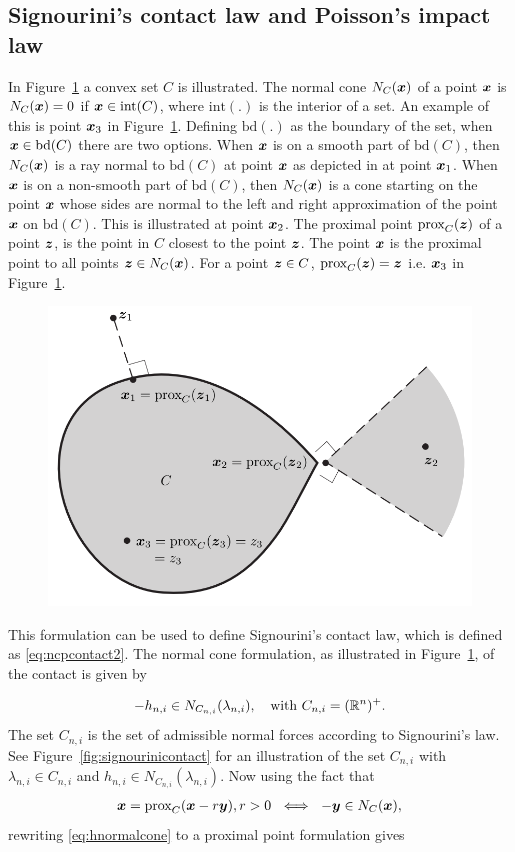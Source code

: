 \documentclass[DC2017114Bouma.tex]{subfiles}
\begin{document}
\subsection{Signourini's contact law and Poisson's impact law}
In Figure~\ref{fig:convex} a convex set $C$ is illustrated. The normal cone $N_C({\boldsymbol{x}})$ of a point ${\boldsymbol{x}}$ is $N_C({\boldsymbol{x}})=0$ if ${\boldsymbol{x}}\in \text{int}(C)$, where $\text{int}(.)$ is the interior of a set. An example of this is point ${\boldsymbol{x}}_3$ in Figure~\ref{fig:convex}. Defining $\text{bd}(.)$ as the boundary of the set, when ${\boldsymbol{x}}\in \text{bd}(C)$ there are two options. When ${\boldsymbol{x}}$ is on a smooth part of $\text{bd}(C)$, then $N_C({\boldsymbol{x}})$ is a ray normal to $\text{bd}(C)$ at point ${\boldsymbol{x}}$ as depicted in at point ${\boldsymbol{x}}_1$. When ${\boldsymbol{x}}$ is on a non-smooth part of $\text{bd}(C)$, then $N_C({\boldsymbol{x}})$ is a cone starting on the point ${\boldsymbol{x}}$ whose sides are normal to the left and right approximation of the point ${\boldsymbol{x}}$ on $\text{bd}(C)$. This is illustrated at point ${\boldsymbol{x}}_2$. The proximal point $\operatorname{\text{prox}}_C({\boldsymbol{z}})$ of a point ${\boldsymbol{z}}$, is the point in $C$ closest to the point ${\boldsymbol{z}}$. The point ${\boldsymbol{x}}$ is the proximal point to all points  ${\boldsymbol{z}}\in N_C({\boldsymbol{x}})$. For a point ${\boldsymbol{z}}\in C$, $\operatorname{\text{prox}}_C({\boldsymbol{z}}) = {\boldsymbol{z}}$ i.e. ${\boldsymbol{x}}_3$ in Figure~\ref{fig:convex}.

\begin{figure}[h]
\centering
\includegraphics[width=.6\textwidth]{convex.PNG}\caption{}\label{fig:convex}
\end{figure}

This formulation can be used to define Signourini's contact law, which is defined as \eqref{eq:ncpcontact2}. The normal cone formulation, as illustrated in Figure~\ref{fig:convex}, of the contact is given by

\begin{align}
-h_{n,i} \in N_{C_{n,i}}(\lambda_{n,i}),\quad \text{with }C_{n,i} = (\mathbb{R}^n)^+.\label{eq:hnormalcone}
\end{align}
The set $C_{n,i}$ is the set of admissible normal forces according to Signourini's law. See Figure~\ref{fig:signourinicontact} for an illustration of the set $C_{n,i}$ with $\lambda_{n,i}\in C_{n,i}$ and $h_{n,i} \in N_{C_{n,i}}(\lambda_{n,i})$. Now using the fact that
\begin{align}
{\boldsymbol{x}} = \operatorname{\text{prox}}_C({\boldsymbol{x}} -r{\boldsymbol{y}}), r > 0\ \iff\ -{\boldsymbol{y}}\in N_C({\boldsymbol{x}}),
\end{align}
rewriting \eqref{eq:hnormalcone} to a proximal point formulation gives 
\end{document}
